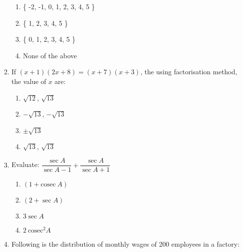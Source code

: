 \begin{enumerate}[label=(\roman*)]
        \begin{multicols}{2}
        \begin{enumerate}[label=(\alph*)]
            \item \{ -2, -1, 0, 1, 2, 3, 4, 5 \} 
            \item \{ 1, 2, 3, 4, 5 \} 
            \item \{ 0, 1, 2, 3, 4, 5 \} 
            \item None of the above
        \end{enumerate}
        \end{multicols}

    \item If $(x+1)(2x+8) = (x+7)(x+3)$, the using factorisation method, the value 
        of $x$ are:

        \begin{multicols}{2}
        \begin{enumerate}[label=(\alph*)]
            \item $\sqrt{12}$, $\sqrt{13}$ 
            \item $-\sqrt{13}$, $-\sqrt{13}$ 
            \item $\pm \sqrt{13}$
            \item $\sqrt{13}$, $\sqrt{13}$ 
        \end{enumerate}
        \end{multicols}

    \item Evaluate: $\dfrac{\sec A}{\sec A - 1} + \dfrac{\sec A}{\sec A + 1}$ 

        \begin{multicols}{2}
        \begin{enumerate}[label=(\alph*)]
            \item $(1 + \mathrm{cosec} \ A )$ 
            \item $(2 + \sec A)$ 
            \item $3 \sec A$ 
            \item $2 \ \mathrm{cosec}^2 A$ 
        \end{enumerate}
        \end{multicols}

    \newpage
    \item Following is the distribution of monthly wages of 200 employees in a factory: 


\end{enumerate}
